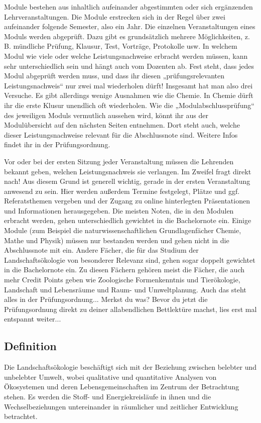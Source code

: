 Module bestehen aus inhaltlich aufeinander abgestimmten oder sich ergänzenden Lehrveranstaltungen. Die Module erstrecken sich in der Regel über zwei aufeinander folgende Semester, also ein Jahr. Die einzelnen Veranstaltungen eines Moduls werden abgeprüft. Dazu gibt es grundsätzlich mehrere Möglichkeiten, z. B. mündliche Prüfung, Klausur, Test, Vorträge, Protokolle usw. In welchem Modul wie viele oder welche Leistungsnachweise erbracht werden müssen, kann sehr unterschiedlich sein und hängt auch vom Dozenten ab. Fest steht, dass jedes Modul abgeprüft werden muss, und dass ihr diesen „prüfungsrelevanten Leistungsnachweis“ nur zwei mal wiederholen dürft! Insgesamt hat man also drei Versuche. Es gibt allerdings wenige Ausnahmen wie die Chemie. In Chemie dürft ihr die erste Klusur unendlich oft wiederholen. Wie die „Modulabschlussprüfung“ des jeweiligen Moduls vermutlich aussehen wird, könnt ihr aus der Modulübersicht auf den nächsten Seiten entnehmen. Dort steht auch, welche dieser Leistungsnachweise relevant für die Abschlussnote sind. Weitere Infos ﬁndet ihr in der Prüfungsordnung.

Vor oder bei der ersten Sitzung jeder Veranstaltung müssen die Lehrenden bekannt geben, welchen Leistungsnachweis sie verlangen. Im Zweifel fragt direkt nach! Aus diesem Grund ist generell wichtig, gerade in der ersten Veranstaltung anwesend zu sein. Hier werden außerdem Termine festgelegt, Plätze und ggf. Referatsthemen vergeben und der Zugang zu online hinterlegten Präsentationen und Informationen herausgegeben.
Die meisten Noten, die in den Modulen erbracht werden, gehen unterschiedlich gewichtet in die Bachelornote ein. Einige Module (zum Beispiel die naturwissenschaftlichen Grundlagenfächer Chemie, Mathe und Physik) müssen nur bestanden werden und gehen nicht in die Abschlussnote mit ein. Andere Fächer, die für das Studium der Landschaftsökologie von besonderer Relevanz sind, gehen sogar doppelt gewichtet in die Bachelornote ein. Zu diesen Fächern gehören meist die Fächer, die auch mehr Credit Points geben wie Zoologische Formenkenntnis und Tierökologie, Landschaft und Lebensräume und Raum- und Umweltplanung. Auch das steht alles in der Prüfungsordnung... Merkst du was? Bevor du jetzt die Prüfungsordnung direkt zu deiner allabendlichen Bettlektüre machst, lies erst mal entspannt weiter...

\subsection*{Definition}
Die Landschaftsökologie beschäftigt sich mit der Beziehung zwischen belebter und unbelebter Umwelt, wobei qualitative und quantitative Analysen von Ökosystemen und deren Lebensgemeinschaften im Zentrum der Betrachtung stehen. Es werden die Stoff- und Energiekreisläufe in ihnen und die Wechselbeziehungen untereinander in räumlicher und zeitlicher Entwicklung betrachtet.

